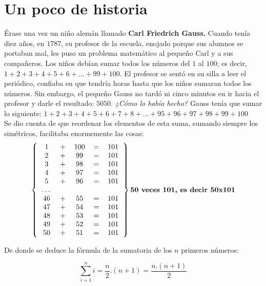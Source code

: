 \section{Un poco de historia}

Érase una vez un niño alemán llamado {\bf Carl Friedrich Gauss. }
Cuando tenía diez años, en $1787$, su profesor de la escuela, enojado porque sus alumnos se portaban mal, les puso un problema matemático al pequeño Carl y a sus compañeros.
Los niños debían sumar todos los números del $1$ al $100$; 
es decir, $1+2+3+4+5+6+...+99+100$. El profesor se sentó en su silla a leer el periódico, 
confiaba en que tendría horas hasta que los niños sumaran todos los números. 
Sin embargo, el pequeño Gauss no tardó ni cinco minutos en ir hacia el profesor y darle el resultado: $5050$. {\it¿Cómo lo había hecho?} \newline
Gauss tenía que sumar lo siguiente:
$1+2+3+4+5+6+7+8+...+95+96+97+98+99+100$ \\
Se dio cuenta de que reordenar los elementos de esta suma, sumando siempre los simétricos, facilitaba enormemente las cosas:\\

\[ 
\left \{
  \begin{tabular}{ccccc}
  1 & + & 100 & = & 101  \\
  2 & + & 99 & = & 101  \\
  3 & + & 98 & = & 101  \\
  4 & + & 97 & = & 101  \\
  5 & + & 96 & = & 101  \\
  \ldots  \\
  46 & + & 55 & = & 101  \\
  47 & + & 54 & = & 101  \\
  48 & + & 53 & = & 101  \\
  49 & + & 52 & = & 101  \\
  50 & + & 51 & = & 101  \\
  \end{tabular}
\right \}\textbf{50 veces 101, es decir 50x101}
\]

De donde se deduce la fórmula de la sumatoria de los $n$ primeros números:

\[ \sum_{i=1}^{n}{i} =  \frac{n}{2}.(n+1)=\frac{n. (n+1)}{2} \]

